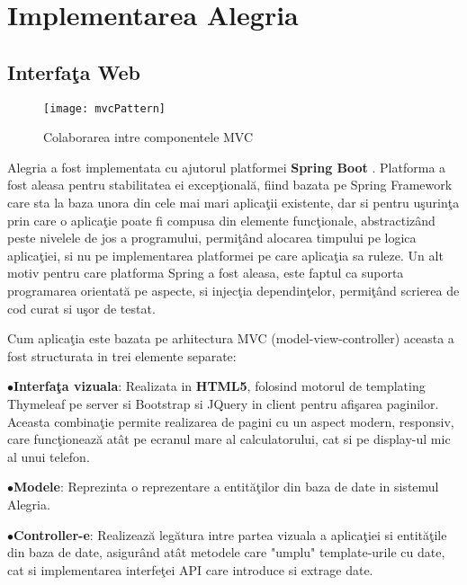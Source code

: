 \chapter{Implementarea Alegria}
\newlength{\bulletwidth}\settowidth{\bulletwidth}{$\bullet$}
\newcommand{\mitem}{\setlength{\leftskip}{\leftmargin}\hspace*{-\labelsep}\hspace*{-\bulletwidth}$\bullet$\hspace*{\labelsep}}
\newcommand{\mend}{\setlength{\leftskip}{0cm}}
\section{Interfaţa Web}
\begin{wrapfigure}{r}{0.35\textwidth}
	\centering
	\captionsetup{justification=centering}
	\texttt{[image: mvcPattern]}
	\caption{Colaborarea intre componentele MVC}
\end{wrapfigure}
Alegria a fost implementata cu ajutorul platformei \textbf{Spring Boot} \autocite{SpringBoot}. Platforma a fost aleasa pentru stabilitatea ei excepţională, fiind bazata pe Spring Framework care sta la baza unora din cele mai mari aplicaţii existente\autocite{springUseCase}, dar si pentru uşurinţa prin care o aplicaţie poate fi compusa din elemente funcţionale, abstractizând peste nivelele de jos a programului, permiţând alocarea timpului pe logica aplicaţiei, si nu pe implementarea platformei pe care aplicaţia sa ruleze. Un alt motiv pentru care platforma Spring a fost aleasa, este faptul ca suporta programarea orientată pe aspecte, si injecţia dependinţelor, permiţând scrierea de cod curat si uşor de testat.

Cum aplicaţia este bazata pe arhitectura MVC (model-view-controller)  aceasta a fost structurata in trei elemente separate: 

\mitem  \textbf{Interfaţa vizuala}: Realizata in \textbf{HTML5}, folosind motorul de templating Thymeleaf pe server si Bootstrap si JQuery in client pentru afişarea paginilor. Aceasta combinaţie permite realizarea de pagini cu un aspect modern, responsiv, care funcţionează atât pe ecranul mare al calculatorului, cat si pe display-ul mic al unui telefon.

\mitem  \textbf{Modele}: Reprezinta o reprezentare a entităţilor din baza de date in sistemul Alegria.

\mitem  \textbf{Controller-e}: Realizează legătura intre partea vizuala a aplicaţiei si entităţile din baza de date, asigurând atât metodele care "umplu" template-urile cu date, cat si implementarea interfeţei API care introduce si extrage date.

